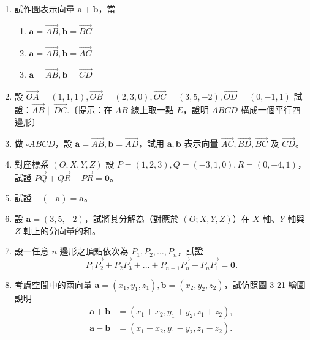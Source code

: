 \begin{enumerate}[label=\arabic*., leftmargin=2em]
  \item 試作圖表示向量 $\mathbf{a} + \mathbf{b}$，當
  \begin{enumerate}[label=(\roman*), leftmargin=2em]
    \item $\mathbf{a} = \vec{AB}, \mathbf{b} = \vec{BC}$
    \item $\mathbf{a} = \vec{AB}, \mathbf{b} = \vec{AC}$
    \item $\mathbf{a} = \vec{AB}, \mathbf{b} = \vec{CD}$
  \end{enumerate}
  \item 設 $\vec{OA} = (1, 1, 1), \vec{OB} = (2, 3, 0), \vec{OC} = (3, 5, -2), \vec{OD} = (0, -1, 1)$ 試證：$\vec{AB} \parallel \vec{DC}$.〔提示：在 $AB$ 線上取一點 $E$，證明 $ABCD$ 構成一個平行四邊形〕
  \item 做 $\square ABCD$，設 $\mathbf{a} = \vec{AB}, \mathbf{b} = \vec{AD}$，試用 $\mathbf{a}, \mathbf{b}$ 表示向量 $\vec{AC}, \vec{BD}, \vec{BC}$ 及 $\vec{CD}$。
  \item 對座標系 $(O; X, Y, Z)$ 設 $P = (1, 2, 3), Q = (-3, 1, 0), R = (0, -4, 1)$，試證 $\vec{PQ} + \vec{QR} - \vec{PR} = \mathbf{0}$。
  \item 試證 $-(-\mathbf{a}) = \mathbf{a}$。
  \item 設 $\mathbf{a} = (3, 5, -2)$，試將其分解為（對應於 $(O; X, Y, Z)$）在 $X$-軸、$Y$-軸與 $Z$-軸上的分向量的和。
  \item 設一任意 $n$ 邊形之頂點依次為 $P_1, P_2, \dots, P_n$，試證
  \[ \vec{P_1 P_2} + \vec{P_2 P_3} + \dots + \vec{P_{n-1} P_n} + \vec{P_n P_1} = \mathbf{0}. \]
  \item 考慮空間中的兩向量 $\mathbf{a} = (x_1, y_1, z_1), \mathbf{b} = (x_2, y_2, z_2)$，試仿照圖 3-21 繪圖說明
  \begin{align*}
  \mathbf{a} + \mathbf{b} &= (x_1 + x_2, y_1 + y_2, z_1 + z_2), \\
  \mathbf{a} - \mathbf{b} &= (x_1 - x_2, y_1 - y_2, z_1 - z_2).
  \end{align*}
\end{enumerate}

